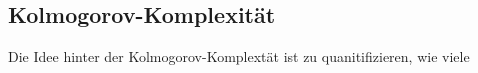 \newpage
\subsection{Kolmogorov-Komplexität}
Die Idee hinter der Kolmogorov-Komplextät ist zu quanitifizieren, wie viele 
